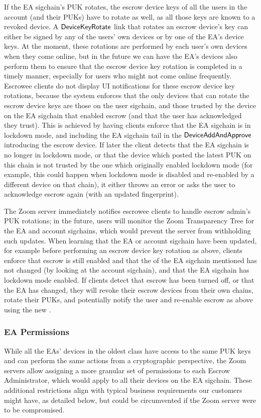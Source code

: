 If the EA sigchain's PUK rotates, the escrow device keys of all the users in the account (and their
PUKs) have to rotate as well, as all those keys are known to a revoked device. A
$\mathsf{DeviceKeyRotate}{}$ link that rotates an escrow device’s key can either be signed by any of the
users’ own devices or by one of the EA's device keys. At the moment, these rotations are performed
by each user’s own devices when they come online, but in the future we can have the EA’s devices
also perform them to ensure that the escrow device key rotation is completed in a timely manner,
especially for users who might not come online frequently. Escrowee clients do not display UI
notifications for these escrow device key rotations, because the system enforces that the only
devices that can rotate the escrow device keys are those on the user sigchain, and those trusted by
the device on the EA sigchain that enabled escrow (and that the user has acknowledged they trust).
This is achieved by having clients enforce that the EA sigchain is in lockdown mode, and including
the EA sigchain tail in the $\mathsf{DeviceAddAndApprove}{}$ introducing the escrow device. If later the
client detects that the EA sigchain is no longer in lockdown mode, or that the device which posted
the latest PUK on this chain is not trusted by the one which originally enabled lockdown mode (for
example, this could happen when lockdown mode is disabled and re-enabled by a different device on
that chain), it either throws an error or asks the user to acknowledge escrow again (with an updated
fingerprint).

The Zoom server immediately notifies escrowee clients to handle escrow admin's PUK rotations; in the
future, users will monitor the Zoom Transparency Tree for the EA and account sigchains, which would
prevent the server from withholding such updates. When learning that the EA or account sigchain have
been updated, for example before performing an escrow device key rotation as above, clients enforce
that escrow is still enabled and that the \userID{} of the EA sigchain mentioned has not changed (by
looking at the account sigchain), and that the EA sigchain has lockdown mode enabled. If clients
detect that escrow has been turned off, or that the EA \userID{} has changed, they will revoke their
escrow devices from their own chains, rotate their PUKs, and potentially notify the user and
re-enable escrow as above using the new \userID{}.

\subsubsection{EA Permissions}
\label{subsubsec:escrowadminperm}
While all the EAs' devices in the oldest class have access to the same PUK keys and can perform the
same actions from a cryptographic perspective, the Zoom servers allow assigning a more granular set
of permissions to each Escrow Administrator, which would apply to all their devices on the EA
sigchain. These additional restrictions align with typical business requirements our customers might
have, as detailed below, but could be circumvented if the Zoom server were to be compromised.

